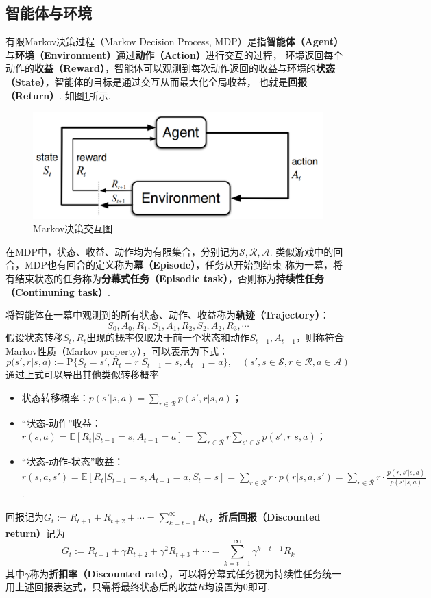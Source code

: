 \documentclass[12pt, a4paper, oneside]{ctexart}
\numberwithin{equation}{section}  %
\def\R{\mathcal{R}}         %
\def\S{\mathcal{S}}         %
\def\A{\mathcal{A}}         %
\def\P{\mathbb{P}}          %
\def\E{\mathbb{E}}          %
\def\P{\mathrm{P}}            %
\begin{document}
\subsection{智能体与环境}
有限Markov决策过程（Markov Decision Process, MDP）是指\textbf{智能体（Agent）}与\textbf{环境（Environment）}通过\textbf{动作（Action）}进行交互的过程，
环境返回每个动作的\textbf{收益（Reward）}，智能体可以观测到每次动作返回的收益与环境的\textbf{状态（State）}，智能体的目标是通过交互从而最大化全局收益，
也就是\textbf{回报（Return）}. 如图\ref{fig-MDP}所示.
\begin{figure}[htbp]
    \centering
    \includegraphics[scale=0.5]{../figures/046页Markov决策中交互图.png}
    \caption{Markov决策交互图}
    \label{fig-MDP}
\end{figure}

在MDP中，状态、收益、动作均为有限集合，分别记为$\S,\R,\A$. 类似游戏中的回合，MDP也有回合的定义称为\textbf{幕（Episode）}，任务从开始到结束
称为一幕，将有结束状态的任务称为\textbf{分幕式任务（Episodic task）}，否则称为\textbf{持续性任务（Continuning task）}.

将智能体在一幕中观测到的所有状态、动作、收益称为\textbf{轨迹（Trajectory）}：
\begin{equation*}
    S_0,A_0,R_1,S_1,A_1,R_2,S_2,A_2,R_3,\cdots
\end{equation*}
假设状态转移$S_t,R_t$出现的概率仅取决于前一个状态和动作$S_{t-1}, A_{t-1}$，则称符合Markov性质（Markov property），可以表示为下式：
\begin{equation*}
    p(s',r|s,a) := \P\{S_t =s', R_t = r|S_{t-1} = s, A_{t-1} = a\},\quad(s',s\in \S, r\in \R, a\in \A)
\end{equation*}
通过上式可以导出其他类似转移概率
\begin{itemize}
    \item 状态转移概率：$p(s'|s,a) = \sum_{r\in\R}p(s',r|s,a)$；
    \item “状态-动作”收益：$r(s,a) = \E[R_t|S_{t-1} = s, A_{t-1} = a] = \sum_{r\in\R}r\sum_{s'\in\S}p(s',r|s,a)$；
    \item “状态-动作-状态”收益：$r(s,a,s') = \E[R_t|S_{t-1} = s, A_{t-1} = a, S_{t} = s] = \sum_{r\in\R}r\cdot p(r|s,a,s') = \sum_{r\in\R}r\cdot \frac{p(r,s'|s,a)}{p(s'|s,a)}$.
\end{itemize}
回报记为$G_t := R_{t+1}+R_{t+2}+\cdots = \sum_{k=t+1}^\infty R_k$，\textbf{折后回报（Discounted return）}记为
\begin{equation*}
    G_{t}:= R_{t+1}+\gamma R_{t+2}+\gamma^2 R_{t+3} + \cdots = \sum_{k=t+1}^\infty \gamma^{k-t-1}R_k
\end{equation*}
其中$\gamma$称为\textbf{折扣率（Discounted rate）}，可以将分幕式任务视为持续性任务统一用上述回报表达式，只需将最终状态后的收益$R$均设置为$0$即可.
\end{document}
